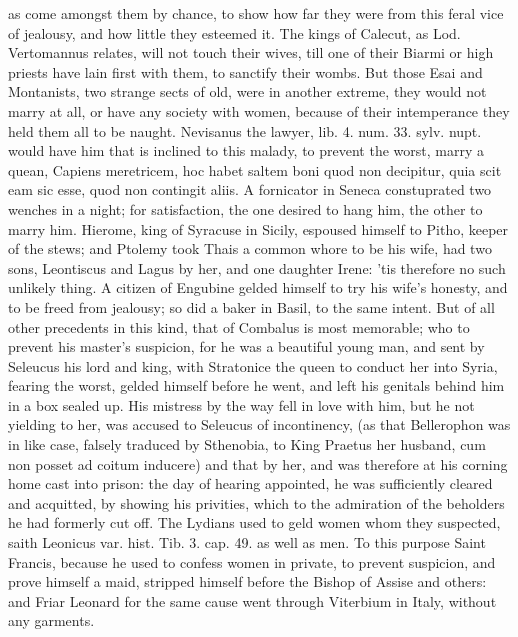 {as come amongst them by chance, to show how far they were from this
feral vice of jealousy, and how little they esteemed it. The kings of
Calecut, as Lod. Vertomannus relates, will not touch their wives,
till one of their Biarmi or high priests have lain first with them, to
sanctify their wombs. But those Esai and Montanists, two strange sects
of old, were in another extreme, they would not marry at all, or have
any society with women, because of their intemperance they held
them all to be naught. Nevisanus the lawyer, lib. 4. num. 33. sylv.
nupt. would have him that is inclined to this malady, to prevent the
worst, marry a quean, Capiens meretricem, hoc habet saltem boni quod
non decipitur, quia scit eam sic esse, quod non contingit aliis. A
fornicator in Seneca constuprated two wenches in a night; for
satisfaction, the one desired to hang him, the other to marry him.
 Hierome, king of Syracuse in Sicily, espoused himself to Pitho,
keeper of the stews; and Ptolemy took Thais a common whore to be his
wife, had two sons, Leontiscus and Lagus by her, and one daughter
Irene: 'tis therefore no such unlikely thing. A citizen of
Engubine gelded himself to try his wife's honesty, and to be freed from
jealousy; so did a baker in  Basil, to the same intent. But of
all other precedents in this kind, that of Combalus is most
memorable; who to prevent his master's suspicion, for he was a
beautiful young man, and sent by Seleucus his lord and king, with
Stratonice the queen to conduct her into Syria, fearing the worst,
gelded himself before he went, and left his genitals behind him in a
box sealed up. His mistress by the way fell in love with him, but he
not yielding to her, was accused to Seleucus of incontinency, (as that
Bellerophon was in like case, falsely traduced by Sthenobia, to King
Praetus her husband, cum non posset ad coitum inducere) and that by
her, and was therefore at his corning home cast into prison: the day of
hearing appointed, he was sufficiently cleared and acquitted, by
showing his privities, which to the admiration of the beholders he had
formerly cut off. The Lydians used to geld women whom they suspected,
saith Leonicus var. hist. Tib. 3. cap. 49. as well as men. To this
purpose Saint Francis, because he used to confess women in
private, to prevent suspicion, and prove himself a maid, stripped
himself before the Bishop of Assise and others: and Friar Leonard for
the same cause went through Viterbium in Italy, without any garments.
}
